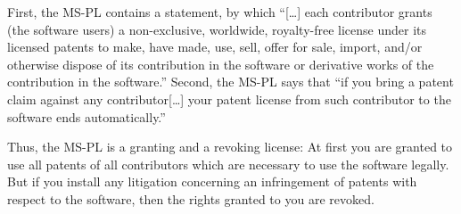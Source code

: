 First, the MS-PL contains a statement, by which \enquote{[\ldots] each 
contributor grants (the software users) a non-exclusive, worldwide, royalty-free 
license under its licensed patents to make, have made, use, sell, offer for 
sale, import, and/or otherwise dispose of its contribution in the software or 
derivative works of the contribution in the software.} Second,
the MS-PL says that \enquote{if you bring a patent claim against any
contributor[\ldots] your patent license from such contributor to the software
ends automatically.} 

Thus, the MS-PL is a granting and a revoking license: At first you are granted
to use all patents of all contributors which are necessary to use the software
legally. But if you install any litigation concerning an infringement of
patents with respect to the software, then the rights granted to you are revoked. 

% 
